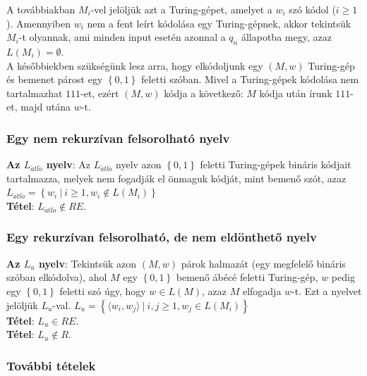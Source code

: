 \documentclass[margin=0px]{article}
\begin{document}
	A továbbiakban $M_{i}$-vel jelöljük azt a Turing-gépet, amelyet a $w_{i}$ szó kódol ($i \geq 1$). Amennyiben
	$w_{i}$ nem a fent leírt kódolása egy Turing-gépnek, akkor tekintsük $M_{i}$-t olyannak, ami minden input esetén
	azonnal a $q_{n}$ állapotba megy, azaz $L(M_{i}) = \emptyset$.\\
	
	A későbbiekben szükségünk lesz arra, hogy elkódoljunk egy $(M, w)$ Turing-gép és bemenet
	párost egy $\left\{0, 1\right\}$ feletti szóban. Mivel a Turing-gépek kódolása nem tartalmazhat
	$111$-et, ezért $(M, w)$ kódja a következő: $M$ kódja után írunk $111$-et, majd utána $w$-t.
	
	\subsubsection{Egy nem rekurzívan felsorolható nyelv}
	
	\noindent \textbf{Az $L_{\acute{a}tl\acute{o}}$ nyelv}: Az $L_{\acute{a}tl\acute{o}}$ nyelv azon $\left\{0, 1\right\}$
	feletti Turing-gépek bináris kódjait tartalmazza, melyek nem fogadják el önmaguk kódját, mint bemenő szót, azaz
	$L_{\acute{a}tl\acute{o}} = \left\{w_{i} \ | \ i \geq 1, w_{i} \notin L(M_{i}) \right\}$\\
	
	\noindent \textbf{Tétel}: $L_{\acute{a}tl\acute{o}} \notin RE$.
	
	\subsubsection{Egy rekurzívan felsorolható, de nem eldönthető nyelv}
	
	\noindent \textbf{Az $L_{u}$ nyelv}: Tekintsük azon $(M, w)$ párok halmazát (egy megfelelő bináris szóban elkódolva),
	ahol $M$ egy $\left\{0, 1\right\}$	bemenő ábécé feletti Turing-gép, $w$ pedig egy $\left\{0, 1\right\}$ feletti
	szó úgy, hogy $w \in L(M)$, azaz $M$ elfogadja $w$-t. Ezt a nyelvet jelöljük $L_{u}$-val.
	$L_{u} = \left\{\langle w_{i},w_{j} \rangle \ | \ i, j \geq 1, w_{j} \in L(M_{i}) \right\}$\\
	
	\noindent \textbf{Tétel}: $L_{u} \in RE$.\\
	
	\noindent \textbf{Tétel}: $L_{u} \notin R$.
	
	\subsubsection{További tételek}
	
\end{document}
